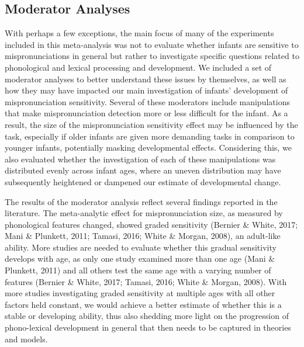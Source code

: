 \documentclass[
  english,
  man, noextraspace]{apa6}
\begin{document}
\hypertarget{moderator-analyses-1}{%
\subsection{Moderator Analyses}\label{moderator-analyses-1}}

With perhaps a few exceptions, the main focus of many of the experiments included in this meta-analysis was not to evaluate whether infants are sensitive to mispronunciations in general but rather to investigate specific questions related to phonological and lexical processing and development. We included a set of moderator analyses to better understand these issues by themselves, as well as how they may have impacted our main investigation of infants' development of mispronunciation sensitivity. Several of these moderators include manipulations that make mispronunciation detection more or less difficult for the infant. As a result, the size of the mispronunciation sensitivity effect may be influenced by the task, especially if older infants are given more demanding tasks in comparison to younger infants, potentially masking developmental effects. Considering this, we also evaluated whether the investigation of each of these manipulations was distributed evenly across infant ages, where an uneven distribution may have subsequently heightened or dampened our estimate of developmental change.

The results of the moderator analysis reflect several findings reported in the literature. The meta-analytic effect for mispronunciation size, as measured by phonological features changed, showed graded sensitivity (Bernier \& White, 2017; Mani \& Plunkett, 2011; Tamasi, 2016; White \& Morgan, 2008), an adult-like ability. More studies are needed to evaluate whether this gradual sensitivity develops with age, as only one study examined more than one age (Mani \& Plunkett, 2011) and all others test the same age with a varying number of features (Bernier \& White, 2017; Tamasi, 2016; White \& Morgan, 2008). With more studies investigating graded sensitivity at multiple ages with all other factors held constant, we would achieve a better estimate of whether this is a stable or developing ability, thus also shedding more light on the progression of phono-lexical development in general that then needs to be captured in theories and models.
\end{document}
